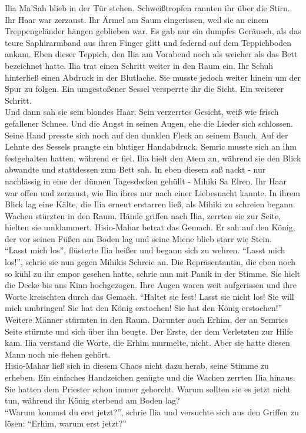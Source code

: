 Ilia Ma'Sah blieb in der Tür stehen. Schweißtropfen rannten ihr über die Stirn. Ihr Haar war 
zerzaust. Ihr Ärmel am Saum eingerissen, weil sie an einem Treppengeländer hängen geblieben war. Es 
gab nur ein dumpfes Geräusch, als das teure Saphirarmband aus ihren Finger glitt und federnd auf 
dem Teppichboden ankam. Eben dieser Teppich, den Ilia am Vorabend noch als weicher als das Bett 
bezeichnet hatte. Ilia trat einen Schritt weiter in den Raum ein. Ihr Schuh hinterließ einen 
Abdruck in der Blutlache. Sie musste jedoch weiter hinein um der Spur zu folgen. Ein umgestoßener 
Sessel versperrte ihr die Sicht. Ein weiterer Schritt.\\
Und dann sah sie sein blondes Haar. Sein verzerrtes Gesicht, weiß wie frisch gefallener Schnee. Und 
die Angst in seinen Augen, ehe die Lieder sich schlossen. Seine Hand presste sich noch auf den 
dunklen Fleck an seinem Bauch. Auf der Lehnte des Sessels prangte ein blutiger Handabdruck. Semric 
musste sich an ihm festgehalten hatten, während er fiel. Ilia hielt den Atem an, während sie den 
Blick abwandte und stattdessen zum Bett sah. In eben diesem saß nackt - nur nachlässig in eine der 
dünnen Tagesdecken gehüllt - Mihiki Sa Elren. Ihr Haar war offen und zerzaust, wie Ilia ihres nur 
nach einer Liebesnacht kannte. In ihrem Blick lag eine Kälte, die Ilia erneut erstarren ließ, als 
Mihiki zu schreien begann.\\
Wachen stürzten in den Raum. Hände griffen nach Ilia, zerrten sie zur Seite, hielten sie 
umklammert. Hisio-Mahar betrat das Gemach. Er sah auf den König, der vor seinen Füßen am Boden lag 
und seine Miene blieb starr wie Stein.\\
``Lasst mich los'', flüsterte Ilia heißer und begann sich zu wehren. ``Lasst mich los!'', schrie 
sie nun gegen Mihikis Schreie an. Die Repräsentantin, die eben noch so kühl zu ihr empor gesehen 
hatte, schrie nun mit Panik in der Stimme. Sie hielt die Decke bis ans Kinn hochgezogen. Ihre Augen 
waren weit aufgerissen und ihre Worte kreischten durch das Gemach. ``Haltet sie fest! Lasst sie 
nicht los! Sie will mich umbringen! Sie hat den König erstochen! Sie hat den König erstochen!''\\
Weitere Männer stürmten in den Raum. Darunter auch Erhim, der an Semrics Seite stürmte und sich 
über ihn beugte. Der Erste, der dem Verletzten zur Hilfe kam. Ilia verstand die Worte, die Erhim 
murmelte, nicht. Aber sie hatte diesen Mann noch nie flehen gehört.\\
Hisio-Mahar ließ sich in diesem Chaos nicht dazu herab, seine Stimme zu erheben. Ein einfaches 
Handzeichen genügte und die Wachen zerrten Ilia hinaus. Sie hatten dem Priester schon immer 
gehorcht. Warum sollten sie es jetzt nicht tun, während ihr König sterbend am Boden lag?\\
``Warum kommst du erst jetzt?'', schrie Ilia und versuchte sich aus den Griffen zu lösen: 
``Erhim, warum erst jetzt?''\\

